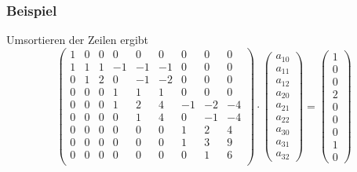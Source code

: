 \begin{frame}\frametitle{Beispiel}
Umsortieren der Zeilen ergibt
$$
\left(\begin{array}{rrr|rrr|rrr}
1&0&0&0&0&0&0&0&0\\
1&1&1&-1&-1&-1&0&0&0\\
0&1&2&0&-1&-2&0&0&0\\
%
0&0&0&1&1&1&0&0&0\\
0&0&0&1&2&4&-1&-2&-4\\
0&0&0&0&1&4&0&-1&-4\\
%
0&0&0&0&0&0&1&2&4\\
0&0&0&0&0&0&1&3&9\\
0&0&0&0&0&0&0&1&6\\
\end{array}\right)\cdot \begin{pmatrix} a_{10}\\a_{11}\\a_{12}\\a_{20}\\a_{21}\\a_{22}\\a_{30}\\a_{31}\\a_{32}\end{pmatrix}  = \begin{pmatrix}1\\0\\0\\2\\0\\0\\0\\1\\0 \end{pmatrix}
$$
\end{frame}
%
